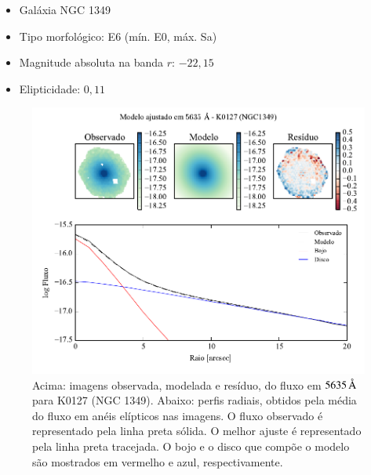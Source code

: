 \begin{itemize}
  \item Galáxia NGC 1349
  \item Tipo morfológico: E6 (mín. E0, máx. Sa)
  \item Magnitude absoluta na banda $r$: $-22,15$
  \item Elipticidade: $0,11$
\end{itemize}

\begin{figure}
	\includegraphics[page=1]{figuras-decomp/K0127_sample006a}
	\caption[Ajuste morfológico em $5635\,\angstrom$ de K0127 (NGC 1349)]
	{Acima: imagens observada, modelada e resíduo, do fluxo em $5635\,\angstrom$
	para K0127 (NGC 1349). Abaixo: perfis radiais, obtidos pela média do fluxo em
	anéis elípticos nas imagens. O fluxo observado é representado pela linha preta
	sólida. O melhor ajuste é representado pela linha preta tracejada. O bojo e o
	disco que compõe o modelo são mostrados em vermelho e azul, respectivamente.}
	\label{fig:decompRadprof:K0127}
\end{figure}

